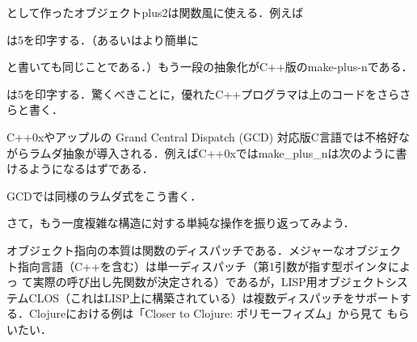 \documentclass[a5paper,twoside,fleqn]{jsbook}
\begin{document}

として作ったオブジェクトplus2は関数風に使える．例えば


は5を印字する．（あるいはより簡単に


と書いても同じことである．）もう一段の抽象化がC++版のmake-plus-nである．


は5を印字する．驚くべきことに，優れたC++プログラマは上のコードをさらさ
らと書く．

C++0xやアップルの Grand Central Dispatch (GCD) 対応版C言語では不格好な
がらラムダ抽象が導入される．例えばC++0xではmake\_plus\_nは次のように書
けるようになるはずである．


GCDでは同様のラムダ式をこう書く．


さて，もう一度複雑な構造に対する単純な操作を振り返ってみよう．

オブジェクト指向の本質は関数のディスパッチである．メジャーなオブジェク
ト指向言語（C++を含む）は単一ディスパッチ（第1引数が指す型ポインタによっ
て実際の呼び出し先関数が決定される）であるが，LISP用オブジェクトシス
テムCLOS（これはLISP上に構築されている）は複数ディスパッチをサポートす
る．Clojureにおける例は「Closer to Clojure: ポリモーフィズム」から見て
もらいたい．
\end{document}
